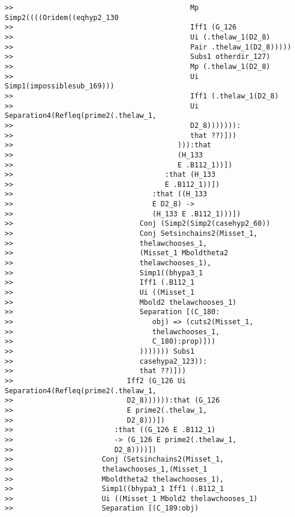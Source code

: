 \documentclass[12pt]{article}
\begin{document}
\begin{verbatim}
>>                                          Mp Simp2((((Oridem((eqhyp2_130
>>                                          Iff1 (G_126
>>                                          Ui (.thelaw_1(D2_8)
>>                                          Pair .thelaw_1(D2_8)))))
>>                                          Subs1 otherdir_127)
>>                                          Mp (.thelaw_1(D2_8)
>>                                          Ui Simp1(impossiblesub_169)))
>>                                          Iff1 (.thelaw_1(D2_8)
>>                                          Ui Separation4(Refleq(prime2(.thelaw_1,
>>                                          D2_8))))))):
>>                                          that ??)]))
>>                                       ))):that
>>                                       (H_133
>>                                       E .B112_1))])
>>                                    :that (H_133
>>                                    E .B112_1))])
>>                                 :that ((H_133
>>                                 E D2_8) ->
>>                                 (H_133 E .B112_1)))])
>>                              Conj (Simp2(Simp2(casehyp2_60))
>>                              Conj Setsinchains2(Misset_1,
>>                              thelawchooses_1,
>>                              (Misset_1 Mboldtheta2
>>                              thelawchooses_1),
>>                              Simp1((bhypa3_1
>>                              Iff1 (.B112_1
>>                              Ui ((Misset_1
>>                              Mbold2 thelawchooses_1)
>>                              Separation [(C_180:
>>                                 obj) => (cuts2(Misset_1,
>>                                 thelawchooses_1,
>>                                 C_180):prop)]))
>>                              ))))))) Subs1
>>                              casehypa2_123)):
>>                              that ??)]))
>>                           Iff2 (G_126 Ui Separation4(Refleq(prime2(.thelaw_1,
>>                           D2_8)))))):that (G_126
>>                           E prime2(.thelaw_1,
>>                           D2_8)))])
>>                        :that ((G_126 E .B112_1)
>>                        -> (G_126 E prime2(.thelaw_1,
>>                        D2_8))))])
>>                     Conj (Setsinchains2(Misset_1,
>>                     thelawchooses_1,(Misset_1
>>                     Mboldtheta2 thelawchooses_1),
>>                     Simp1((bhypa3_1 Iff1 (.B112_1
>>                     Ui ((Misset_1 Mbold2 thelawchooses_1)
>>                     Separation [(C_189:obj)

\end{verbatim}
\end{document}
